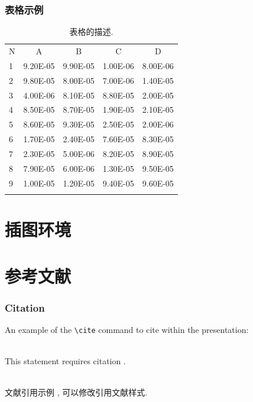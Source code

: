 \documentclass[notheorems,11pt]{beamer}
\theoremstyle{plain}
\numberwithin{theorem}{section}
\numberwithin{definition}{section}
\numberwithin{lemma}{section}
\numberwithin{proposition}{section}
\numberwithin{corollary}{section}
\theoremstyle{example}
\numberwithin{figure}{section}
\numberwithin{table}{section}
\numberwithin{equation}{section}
\begin{document}

\begin{frame}
\frametitle{表格示例}
\begin{table}[htp!]
\centering
\renewcommand\arraystretch{1.0} %
\caption{表格的描述.}
\label{tab3:NumError}
\begin{tabularx}{0.9\textwidth}{|P{1cm}|C|C|C|C|}
\Xhline{2\arrayrulewidth}
N  & A       & B    & C  & D   \\
\Xhline{2\arrayrulewidth}
1  & 9.20E-05 & 9.90E-05 & 1.00E-06 & 8.00E-06  \\
2  & 9.80E-05 & 8.00E-05 & 7.00E-06 & 1.40E-05  \\
3  & 4.00E-06 & 8.10E-05 & 8.80E-05 & 2.00E-05 \\
4  & 8.50E-05 & 8.70E-05 & 1.90E-05 & 2.10E-05 \\
5 & 8.60E-05 & 9.30E-05 & 2.50E-05 & 2.00E-06  \\
6 & 1.70E-05 & 2.40E-05 & 7.60E-05 & 8.30E-05  \\
7 & 2.30E-05 & 5.00E-06 & 8.20E-05 & 8.90E-05 \\
8 & 7.90E-05 & 6.00E-06 & 1.30E-05 & 9.50E-05  \\
9 & 1.00E-05 & 1.20E-05 & 9.40E-05 & 9.60E-05 \\
\Xhline{2\arrayrulewidth}
\end{tabularx}
\end{table}

\end{frame}


\section{插图环境}



\section{参考文献}

\begin{frame}[fragile] %
\frametitle{Citation}
An example of the \verb|\cite| command to cite within the presentation:\\~

This statement requires citation \cite{Smith2012}. \\~

文献引用示例 \cite{LiLiu1997}, 可以修改引用文献样式.
\end{frame}
\end{document}
